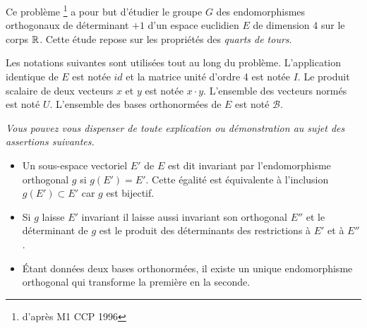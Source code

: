 Ce problème \footnote{d'après M1 CCP 1996} a pour but d'étudier le groupe $G$ des endomorphismes orthogonaux de déterminant $+1$ d'un espace euclidien $E$ de dimension 4 sur le corps $\mathbb{R}$. Cette étude repose sur les propriétés des \emph{quarts de tours}.

Les notations suivantes sont utilisées tout au long du problème. L'application identique de $E$ est notée $id$ et la matrice unité d'ordre 4 est notée $I$. Le produit scalaire de deux vecteurs $x$ et $y$ est notée $x\cdot y$. L'ensemble des vecteurs normés est noté $U$. L'ensemble des bases orthonormées de $E$ est noté $\mathcal{B}$.

\emph{Vous pouvez vous dispenser de toute explication ou démonstration au sujet des assertions suivantes.}
\begin{itemize}
\item Un sous-espace vectoriel $E'$ de $E$ est dit invariant par l'endomorphisme orthogonal $g$ si $g(E')=E'$. Cette égalité est équivalente à l'inclusion $g(E')\subset E'$ car $g$ est bijectif.
\item Si $g$ laisse $E'$ invariant il laisse aussi invariant son orthogonal $E''$ et le déterminant de $g$ est le produit des déterminants des restrictions à $E'$ et à $E''$.
\item {\'E}tant données deux bases orthonormées, il existe un unique endomorphisme orthogonal qui transforme la première en la seconde.
\end{itemize}


